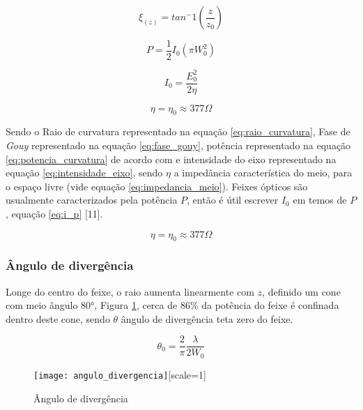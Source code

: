 \begin{equation}
\label{eq:fase_gouy}
\xi_{(z)} = tan^-1 \left( \frac{z}{z_0} \right )
\end{equation}

\begin{equation}
\label{eq:potencia_curvatura}
P=\frac{1}{2} I_0 \left( \pi W_0^2 \right )
\end{equation}

\begin{equation}
\label{eq:intensidade_eixo}
I_0 = \frac{E_0^2}{2 \eta}
\end{equation}

\begin{equation}
\label{eq:impedancia_meio}
\eta = \eta_0 \approx 377 \Omega
\end{equation}

Sendo o Raio de curvatura representado na equação \eqref{eq:raio_curvatura}, Fase de \emph{Gouy} representado na equação \eqref{eq:fase_gouy}, potência representado na equação \eqref{eq:potencia_curvatura} de acordo com e intensidade do eixo representado na equação \eqref{eq:intensidade_eixo}, sendo $\eta$ a impedância característica do meio, para o espaço livre (vide equação \eqref{eq:impedancia_meio}). Feixes ópticos são usualmente caracterizados pela potência $P$, então é útil escrever $I_0$ em temos de $P$ , equação \eqref{eq:i_p} [11].

\begin{equation}
\label{eq:i_p}
\eta = \eta_0 \approx 377 \Omega
\end{equation}

\subsubsection{Ângulo de divergência}

Longe do centro do feixe, o raio aumenta linearmente com $z$, definido um cone com meio ângulo \ang{80}, Figura \ref{fig:angulo_divergencia}, cerca de 86\% da potência do feixe é confinada dentro deste cone, sendo $\theta$ ângulo de divergência teta zero do feixe.

\begin{equation}
\label{eq:angulo_divergencia}
\theta_0 = \frac{2}{\pi} \frac{\lambda}{2 W_0}
\end{equation}

\begin{figure}[ht!]
	\centering
	\caption{Ângulo de divergência}
	\label{fig:angulo_divergencia}
	\texttt{[image: angulo\_divergencia]}[scale=1]
\end{figure}

